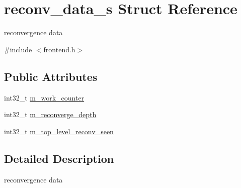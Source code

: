 \hypertarget{structreconv__data__s}{
\section{reconv\_\-data\_\-s Struct Reference}
\label{structreconv__data__s}
}


reconvergence data  




{\ttfamily \#include $<$frontend.h$>$}

\subsection*{Public Attributes}
\begin{DoxyCompactItemize}
\item 
int32\_\-t \hyperlink{structreconv__data__s_ac79260e63c70c3ed072a91b31d0744d1}{m\_\-work\_\-counter}
\item 
int32\_\-t \hyperlink{structreconv__data__s_a1b2d372adb1e9920c6a37fd3e1b72a77}{m\_\-reconverge\_\-depth}
\item 
int32\_\-t \hyperlink{structreconv__data__s_a14a215431914767f23ecd5529a02ccac}{m\_\-top\_\-level\_\-reconv\_\-seen}
\end{DoxyCompactItemize}


\subsection{Detailed Description}
reconvergence data 

